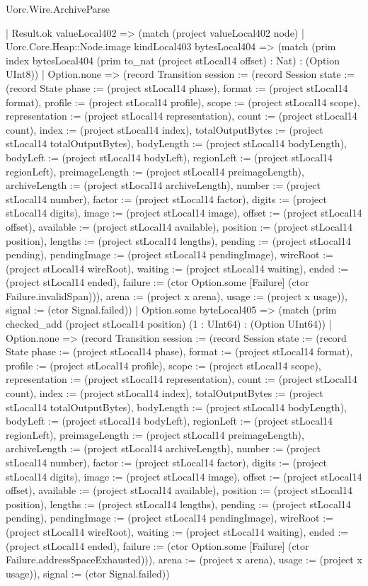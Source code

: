 \begin{lexlean}{Uorc.Wire.ArchiveParse}
\begin{semanticmodule}
{          | Result.ok valueLocal402 => (match (project valueLocal402 node)
            | Uorc.Core.Heap::Node.image kindLocal403 bytesLocal404 => (match (prim index bytesLocal404 (prim to_nat (project stLocal14 offset) : Nat) : (Option UInt8))
              | Option.none => (record Transition {session := (record Session {state := (record State {phase := (project stLocal14 phase), format := (project stLocal14 format), profile := (project stLocal14 profile), scope := (project stLocal14 scope), representation := (project stLocal14 representation), count := (project stLocal14 count), index := (project stLocal14 index), totalOutputBytes := (project stLocal14 totalOutputBytes), bodyLength := (project stLocal14 bodyLength), bodyLeft := (project stLocal14 bodyLeft), regionLeft := (project stLocal14 regionLeft), preimageLength := (project stLocal14 preimageLength), archiveLength := (project stLocal14 archiveLength), number := (project stLocal14 number), factor := (project stLocal14 factor), digits := (project stLocal14 digits), image := (project stLocal14 image), offset := (project stLocal14 offset), available := (project stLocal14 available), position := (project stLocal14 position), lengths := (project stLocal14 lengths), pending := (project stLocal14 pending), pendingImage := (project stLocal14 pendingImage), wireRoot := (project stLocal14 wireRoot), waiting := (project stLocal14 waiting), ended := (project stLocal14 ended), failure := (ctor Option.some [Failure] (ctor Failure.invalidSpan))}), arena := (project x arena), usage := (project x usage)}), signal := (ctor Signal.failed)})
              | Option.some byteLocal405 => (match (prim checked_add (project stLocal14 position) (1 : UInt64) : (Option UInt64))
                | Option.none => (record Transition {session := (record Session {state := (record State {phase := (project stLocal14 phase), format := (project stLocal14 format), profile := (project stLocal14 profile), scope := (project stLocal14 scope), representation := (project stLocal14 representation), count := (project stLocal14 count), index := (project stLocal14 index), totalOutputBytes := (project stLocal14 totalOutputBytes), bodyLength := (project stLocal14 bodyLength), bodyLeft := (project stLocal14 bodyLeft), regionLeft := (project stLocal14 regionLeft), preimageLength := (project stLocal14 preimageLength), archiveLength := (project stLocal14 archiveLength), number := (project stLocal14 number), factor := (project stLocal14 factor), digits := (project stLocal14 digits), image := (project stLocal14 image), offset := (project stLocal14 offset), available := (project stLocal14 available), position := (project stLocal14 position), lengths := (project stLocal14 lengths), pending := (project stLocal14 pending), pendingImage := (project stLocal14 pendingImage), wireRoot := (project stLocal14 wireRoot), waiting := (project stLocal14 waiting), ended := (project stLocal14 ended), failure := (ctor Option.some [Failure] (ctor Failure.addressSpaceExhausted))}), arena := (project x arena), usage := (project x usage)}), signal := (ctor Signal.failed)})
}
\end{semanticmodule}
\end{lexlean}
